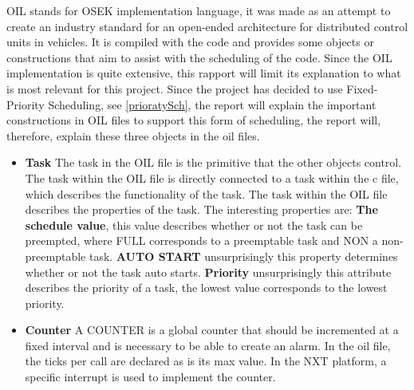 OIL stands for OSEK implementation language, it was made as an attempt to create an industry standard for an open-ended architecture for distributed control units in vehicles\cite{OILManual}. It is compiled with the code and provides some objects or constructions that aim to assist with the scheduling of the code. Since the OIL implementation is quite extensive, this rapport will limit its explanation to what is most relevant for this project. Since the project has decided to use Fixed-Priority Scheduling, see \ref{prioratySch}, the report will explain the important constructions in OIL files to support this form of scheduling, the report will, therefore, explain these three objects in the oil files.

\begin{itemize}
    \item{\textbf{Task}}
    The task in the OIL file is the primitive that the other objects control. The task within the OIL file is directly connected to a task within the c file, which describes the functionality of the task. The task within the OIL file describes the properties of the task. The interesting properties are: \textbf{The schedule value}, this value describes whether or not the task can be preempted, where FULL corresponds to a preemptable task and NON a non-preemptable task. \textbf{AUTO START} unsurprisingly this property determines whether or not the task auto starts. 
    \textbf{Priority} unsurprisingly this attribute describes the priority of a task, the lowest value corresponds to the lowest priority.
    \item{\textbf{Counter}}
    A COUNTER is a global counter that should be incremented at a fixed interval and is necessary to be able to create an alarm. In the oil file, the ticks per call are declared as is its max value. In the NXT platform, a specific interrupt is used to implement the counter. 

\end{itemize}
